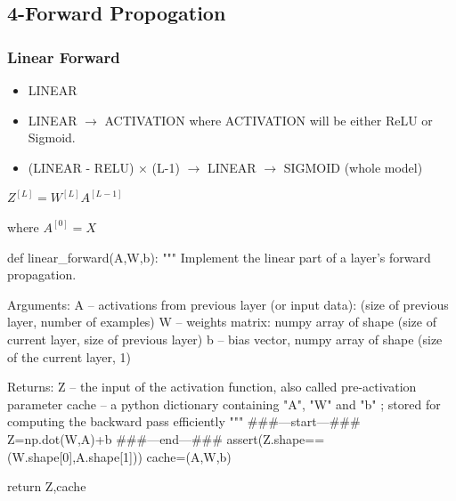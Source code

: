 \documentclass[12pt,a4paper]{article}
\begin{document}
	\subsection{4-Forward Propogation}
		\subsubsection{Linear Forward}
			\begin{itemize}
				\item LINEAR
				\item LINEAR $\rightarrow$ ACTIVATION where ACTIVATION will be either ReLU or Sigmoid.
				\item (LINEAR - RELU) × (L-1) $\rightarrow$ LINEAR $\rightarrow$ SIGMOID (whole model)				
			\end{itemize}
			$Z^{[L]}=W^{[L]}A^{[L-1]}$\par
			where $A^{[0]}=X$
			\newpage
			\begin{python}
				def linear_forward(A,W,b):
				"""
				Implement the linear part of a layer's forward propagation.
				
				Arguments:
				A -- activations from previous layer (or input data): (size of previous layer, number of examples)
				W -- weights matrix: numpy array of shape (size of current layer, size of previous layer)
				b -- bias vector, numpy array of shape (size of the current layer, 1)
				
				Returns:
				Z -- the input of the activation function, also called pre-activation parameter
				cache -- a python dictionary containing "A", "W" and "b" ; stored for computing the backward pass efficiently
				"""
				###---start---###
				Z=np.dot(W,A)+b
				###---end---###
				assert(Z.shape==(W.shape[0],A.shape[1]))
				cache=(A,W,b)
				
				return Z,cache
			\end{python}
		\newpage
\end{document}
